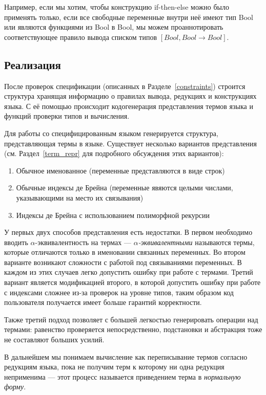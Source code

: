 Например, если мы хотим, чтобы конструкцию if-then-else можно было применять только, если все свободные переменные внутри неё имеют тип Bool или являются функциями из Bool в Bool, мы можем проаннотировать соответствующее правило вывода списком типов $[Bool, Bool\rightarrow Bool]$.

\subsection*{Реализация}

После проверок спецификации (описанных в Разделе~\ref{constraints}) строится структура хранящая информацию о правилах вывода, редукциях и конструкциях языка. С её помощью происходит кодогенерация представления термов языка и функций проверки типов и вычисления.

Для работы со специфицированным языком генерируется структура, представляющая термы в языке. Существует несколько вариантов представления (см. Раздел~\ref{term_repr} для подробного обсуждения этих вариантов):
\begin{enumerate}
\item Обычное именованное (переменные представляются в виде строк)
\item Обычные индексы де Брейна\cite{de_brujin} (переменные явяются целыми числами, указывающими на место их связывания)
\item Индексы де Брейна с использованием полиморфной рекурсии\cite{poly_rec}
\end{enumerate}

У первых двух способов представления есть недостатки. В первом необходимо вводить $\alpha$-эквивалентность на термах --- \textit{$\alpha$-эквивалентными} называются термы, которые отличаются только в именовании связанных переменных. Во втором варианте возникают сложности с работой под связываниями переменных. В каждом из этих случаев легко допустить ошибку при работе с термами. Третий вариант является модификацией второго, в которой допустить ошибку при работе с индексами сложнее из-за проверок на уровне типов, таким образом код пользователя получается имеет больше гарантий корректности.

Также третий подход позволяет с большей легкостью генерировать операции над термами: равенство проверяется непосредственно, подстановки и абстракция тоже не составляют больших усилий.

\hfill

В дальнейшем мы понимаем вычисление как переписывание термов согласно редукциям языка, пока не получим терм к которому ни одна редукция неприменима --- этот процесс называется приведением терма в \textit{нормальную форму}.


